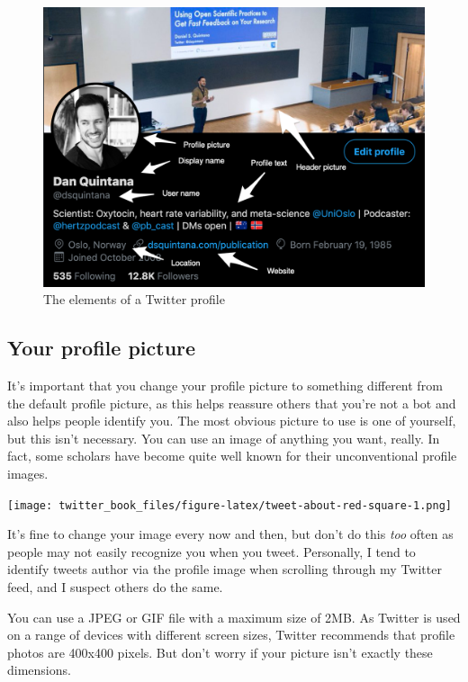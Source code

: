 \documentclass[
]{book}
\begin{document}
\begin{figure}

\includegraphics[width=0.8\linewidth]{images/profile} \hfill{}

\caption{The elements of a Twitter profile}\label{fig:unnamed-chunk-4}
\end{figure}

\hypertarget{your-profile-picture}{%
\subsection*{Your profile picture}\label{your-profile-picture}}

It's important that you change your profile picture to something different from the default profile picture, as this helps reassure others that you're not a bot and also helps people identify you. The most obvious picture to use is one of yourself, but this isn't necessary. You can use an image of anything you want, really. In fact, some scholars have become quite well known for their unconventional profile images.

\texttt{[image: twitter\_book\_files/figure-latex/tweet-about-red-square-1.png]}

It's fine to change your image every now and then, but don't do this \emph{too} often as people may not easily recognize you when you tweet. Personally, I tend to identify tweets author via the profile image when scrolling through my Twitter feed, and I suspect others do the same.

You can use a JPEG or GIF file with a maximum size of 2MB. As Twitter is used on a range of devices with different screen sizes, Twitter recommends that profile photos are 400x400 pixels. But don't worry if your picture isn't exactly these dimensions.
\end{document}
